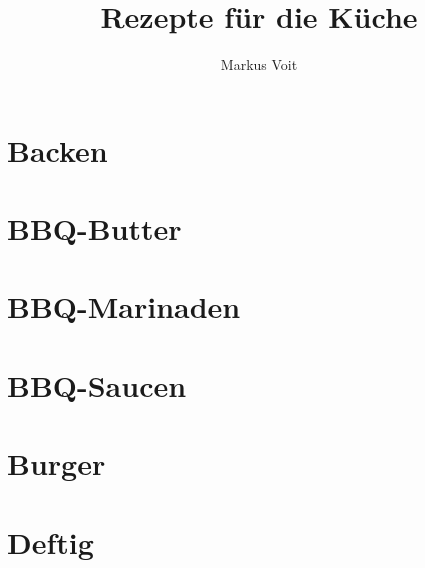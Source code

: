 \documentclass[
  DIV=11,%
  pagesize,%
  fontsize=11pt,%
  paper=a4,%
  numbers=noenddot,
]{scrartcl}
\title{Rezepte für die Küche}
\author{Markus Voit}
\begin{document}
\maketitle
\clearpage

\tableofcontents
\clearpage

\section{Backen}
\newpage
\newpage

\section{BBQ-Butter}
\newpage
\newpage
\newpage
\newpage
\newpage

\section{BBQ-Marinaden}
\newpage
\newpage
\newpage

\section{BBQ-Saucen}
\newpage
\newpage
\newpage
\newpage
\newpage
\newpage
\newpage

\section{Burger}
\newpage
\newpage

\section{Deftig}
\newpage
\newpage
\newpage
\newpage
\end{document}
